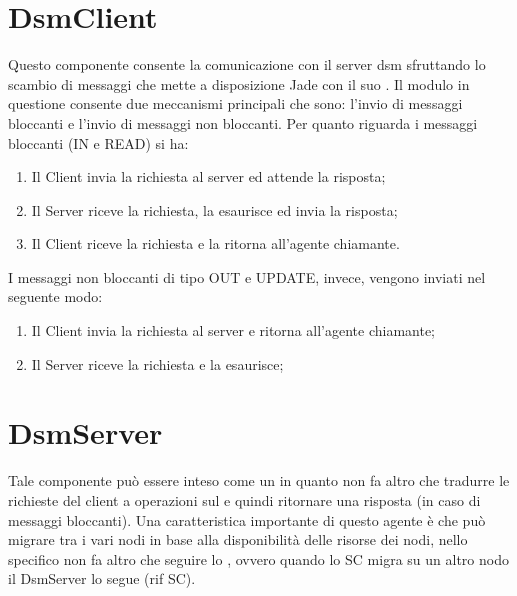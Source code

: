 \section{DsmClient}
Questo componente consente la comunicazione con il server\cite{gino} dsm sfruttando lo scambio di messaggi che mette a disposizione Jade con il suo . Il modulo in questione consente due meccanismi principali che sono: l'invio di messaggi bloccanti e l'invio di messaggi non bloccanti. Per quanto riguarda i messaggi bloccanti (IN e READ) si ha:
\begin{enumerate}
	\item Il Client invia la richiesta al server ed attende la risposta;
	\item Il Server riceve la richiesta, la esaurisce ed invia la risposta;
	\item Il Client riceve la richiesta e la ritorna all'agente chiamante.
\end{enumerate}
I messaggi non bloccanti di tipo OUT e UPDATE, invece, vengono inviati nel seguente modo:
\begin{enumerate}
	\item Il Client invia la richiesta al server e ritorna all'agente chiamante;
	\item Il Server riceve la richiesta e la esaurisce;
\end{enumerate}
\section{DsmServer}
Tale componente può essere inteso come un  in quanto non fa altro che tradurre le richieste del client a operazioni sul  e quindi ritornare una risposta (in caso di messaggi bloccanti). Una caratteristica importante di questo agente è che può migrare tra i vari nodi in base alla disponibilità delle risorse dei nodi, nello specifico non fa altro che seguire lo , ovvero quando lo SC migra su un altro nodo il DsmServer lo segue (rif SC).